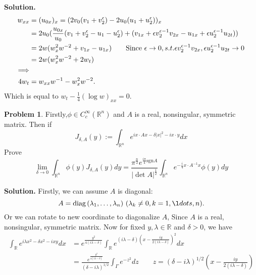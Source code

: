 \documentclass[a4paper]{book}
\newcommand{\sgn}{\mathrm{sgn}}
\newenvironment{solution}%
{\noindent\textbf{Solution.}}%
{\qedhere}
\numberwithin{equation}{chapter}
\theoremstyle{definition}
\newtheorem{pro}[exm]{Problem}
\begin{document}
\begin{solution}
\begin{align*}
    w_{xx} &= (u_{0x})_x = (2v_0(v_1 + v_2^\epsilon) - 2u_0(u_1 + u_2^\epsilon))_x \\
          &= 2u_0(\frac{u_{0x}}{u_0}(v_1 + v_2^\epsilon - u_1 - u_2^\epsilon) + (v_{1x} + \epsilon v_2^{\epsilon-1}v_{2x} - u_{1x} + \epsilon u_2^{\epsilon-1}u_{2t})) \\
          &= 2w( w_x^2 w^{-2} + v_{1x} - u_{1x})  \qquad \textmd{Since } \epsilon \rightarrow 0,s.t.\epsilon v_2^{\epsilon-1}v_{2x}, \epsilon u_2^{\epsilon-1}u_{2t} \rightarrow 0 \\
          &= 2w (w_x^2 w^{-2} + 2w_t)  \\
    \Longrightarrow \\
    4 w_t &= w_{xx} w^{-1} - w_x^2 w^{-2}.
  \end{align*}
  Which is equal to $w_t - \frac{1}{4} (\log w)_{xx} = 0$.
\end{solution}

\begin{pro}
  Firstly,$\phi \in C^\infty_c(\mathbb{R}^n)$ and $A$ is a real, nonsingular, symmetric matrix. Then if
  \[J_{\delta,A}(y) := \int_{\mathbb{R}^n} e^{i x \cdot A x - \delta \left| x \right|^2 - ix \cdot y}dx\]
  Prove
  \[\lim_{\delta \rightarrow 0}\int_{\mathbb{R}^n} \phi(y) J_{\delta,A}(y)dy = \frac{\pi^\frac{n}{2} e^{\frac{i \pi}{4} \sgn A}}{\left| \det A \right|^{\frac{1}{2}}} \int_{\mathbb{R}^n} e^{-\frac{i}{4} x \cdot A^{-1} x} \phi(y) dy \]
\end{pro}

\begin{solution}
  Firstly, we can assume $A$ is diagonal:
  \[A = \textmd{diag}\, (\lambda_1,\ldots, \lambda_n)\ (\lambda_k \not= 0, k = 1, \l dots,n).\]
  Or we can rotate to new coordinate to diagonalize $A$, Since $A$ is a real, nonsingular, symmetric matrix. Now for fixed $y, \lambda \in \mathbb{R}$ and $ \delta > 0$, we have
  \begin{align*}
    \int_{\mathbb{R}} e^{i\lambda x^2 - \delta x^2 - ixy} dx &= e^{\frac{y^2}{4(i\lambda - \delta)}} \int_{\mathbb{R}} e^{(i\lambda - \delta)\left(x - \frac{iy}{2(i\lambda - \delta)}\right)^2} dx \\
                                                             &= \frac{e^{\frac{y^2}{4(i\lambda - \delta)}}}{(\delta - i\lambda)^{1/2}} \int_{\Gamma} e^{-z^2} dz \qquad z = (\delta - i\lambda)^{1/2}\left(x - \frac{iy}{2(i\lambda - \delta)}\right) \\
  \end{align*}
\end{solution}


%   

%   

%   


\end{document}
